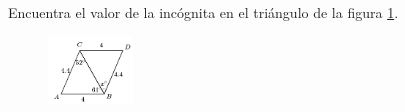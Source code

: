 \question[10]  Encuentra el valor de la incógnita en el triángulo de la figura \ref{fig:angle_triangle_03}.
\begin{figure}[H]
    \begin{center}
        \includegraphics[width=0.2\textwidth]{../images/angle_triangle_03.png}
    \end{center}
    \caption{}
    \label{fig:angle_triangle_03}
\end{figure}